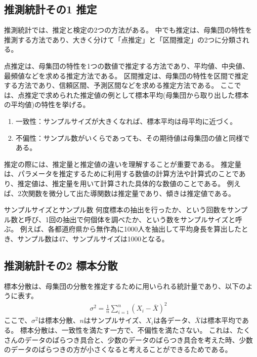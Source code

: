 \documentclass{ltjsarticle}
\begin{document}
\newpage

\subsection{推測統計その1 推定}
推測統計では、推定と検定の2つの方法がある。
中でも推定は、母集団の特性を推測する方法であり、大きく分けて「点推定」と「区間推定」の2つに分類される。
\par
点推定は、母集団の特性を1つの数値で推定する方法であり、平均値、中央値、最頻値などを求める推定方法である。
区間推定は、母集団の特性を区間で推定する方法であり、信頼区間、予測区間などを求める推定方法である。
ここでは、点推定で求められた推定値の例として標本平均(母集団から取り出した標本の平均値)の特性を挙げる。
\begin{enumerate}
  \item 一致性：サンプルサイズが大きくなれば、標本平均は母平均に近づく。
  \item 不偏性：サンプル数がいくらであっても、その期待値は母集団の値と同様である。
\end{enumerate}
\par
推定の際には、推定量と推定値の違いを理解することが重要である。
推定量は、パラメータを推定するために利用する数値の計算方法や計算式のことであり、推定値は、推定量を用いて計算された具体的な数値のことである。
例えば、2次関数を微分して出た導関数は推定量であり、傾きは推定値である。

\begin{itembox}[l]{サンプルサイズとサンプル数}
  何度標本の抽出を行ったか、という回数をサンプル数と呼び、1回の抽出で何個体を調べたか、という数をサンプルサイズと呼ぶ。
  例えば、各都道府県から無作為に1000人を抽出して平均身長を算出したとき、サンプル数は47、サンプルサイズは1000となる。 
\end{itembox}

\newpage

\subsection{推測統計その2 標本分散}
標本分散は、母集団の分散を推定するために用いられる統計量であり、以下のように表す。
\begin{align}
\sigma^2 = \frac{1}{n} \sum_{i=1}^{n} (X_i - \bar{X})^2
\end{align}
ここで、$\sigma^2$は標本分散、$n$はサンプルサイズ、$X_i$は各データ、$\bar{X}$は標本平均である。
標本分散は、一致性を満たす一方で、不偏性を満たさない。
これは、たくさんのデータのばらつき具合と、少数のデータのばらつき具合を考えた時、少数のデータのばらつきの方が小さくなると考えることができるためである。
\end{document}
